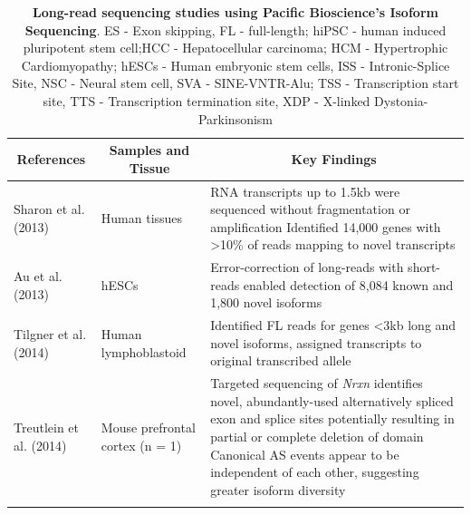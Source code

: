 \begin{changemargin}{1.5cm}	
	\begin{landscape}
		\small %
		\setlength\tabcolsep{2pt} %
		\renewcommand{\arraystretch}{1}
		\begin{longtable}[c]{p{4cm}p{4cm}p{18cm}}
			\caption[Long-read sequencing studies using Pacific Bioscience's Isoform Sequencing]%
			{\textbf{Long-read sequencing studies using Pacific Bioscience's Isoform Sequencing}. ES - Exon skipping, FL - full-length; hiPSC - human induced pluripotent stem cell;HCC - Hepatocellular carcinoma; HCM - Hypertrophic Cardiomyopathy; hESCs - Human embryonic stem cells, ISS - Intronic-Splice Site, NSC - Neural stem cell, SVA - SINE-VNTR-Alu; TSS - Transcription start site, TTS - Transcription termination site, XDP - X-linked Dystonia-Parkinsonism}
			\label{tab: longread_isoseqstudies}\\
			
			\toprule
			\multicolumn{1}{c}{References} &
			\multicolumn{1}{c}{Samples and Tissue} &
			\multicolumn{1}{c}{Key Findings} \\* \midrule
			\endfirsthead
			\endhead
			\bottomrule
			\endfoot
			\endlastfoot
			\centering Sharon et al. (2013)\cite{Sharon2013} &
			\centering 20 Human tissues &
			\tabitem RNA transcripts up to 1.5kb were sequenced without fragmentation or amplification \newline
			\tabitem Identified 14,000 genes with >10\% of reads mapping to novel transcripts  \\
			\hdashline[0.5pt/5pt] 
			
			\centering Au et al. (2013)\cite{Au2013} &
			\centering hESCs &
			\tabitem Error-correction of long-reads with short-reads enabled detection of 8,084 known and 1,800 novel isoforms \\
			\hdashline[0.5pt/5pt]
			
			\centering Tilgner et al. (2014) \cite{Tilgner2014} &
			\centering Human lymphoblastoid  &
			\tabitem Identified FL reads for genes <3kb long and novel isoforms, assigned transcripts to original transcribed allele \\
			\hdashline[0.5pt/5pt]
			
			\centering Treutlein et al. (2014)\cite{Treutlein2014} &
			\centering Mouse prefrontal cortex (n = 1) &
			\tabitem Targeted sequencing of \textit{Nrxn} identifies novel, abundantly-used alternatively spliced exon and splice sites potentially resulting in partial or complete deletion of domain \newline
			\tabitem Canonical AS events appear to be independent of each other, suggesting greater isoform diversity  \\
			\hdashline[0.5pt/5pt]
			

\end{longtable}
\end{landscape}
\end{changemargin}
